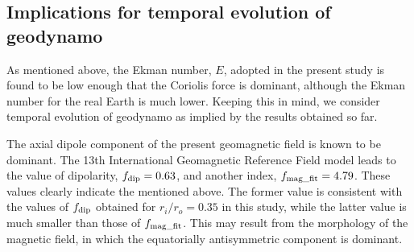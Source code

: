 {\color{blue}
}

\subsection{Implications for temporal evolution of geodynamo}

{\color{red}
As mentioned above, the Ekman number, $E$, adopted in the present study is found to be low enough that the Coriolis force is dominant, although the Ekman number for the real Earth is much lower.
Keeping this in mind, we consider temporal evolution of geodynamo as implied by the results obtained so far.
}

{\color{red}
The axial dipole component of the present geomagnetic field is known to be dominant.
The 13th International Geomagnetic Reference Field model \cite{Alken:2021} leads to the value of dipolarity, $f_{\rm dip} = 0.63$, and another index, $f_{\rm mag\_fit} = 4.79$.
These values clearly indicate the mentioned above.
The former value is consistent with the values of $f_{\rm dip}$ obtained for $r_i / r_o = 0.35$ in this study, while the latter value is much smaller than those of $f_{\rm mag\_fit}$.
This may result from the morphology of the magnetic field, in which the equatorially antisymmetric component is dominant.
}


